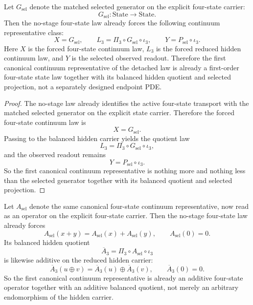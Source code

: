 \begin{theorem}
\label{thm:the-no-stage-four-state-law-already-has-a-canonical-first-order-continuum-representative}
Let \(G_{\mathrm{sel}}\) denote the matched selected generator on the explicit
four-state carrier:
\[
G_{\mathrm{sel}}:\mathrm{State}\to\mathrm{State}.
\]
Then the no-stage four-state law already forces the following continuum
representative class:
\[
X = G_{\mathrm{sel}},\qquad
L_3 = \Pi_3 \circ G_{\mathrm{sel}} \circ \iota_3,\qquad
Y = P_{\mathrm{sel}} \circ \iota_3.
\]
Here \(X\) is the forced four-state continuum law, \(L_3\) is the forced
reduced hidden continuum law, and \(Y\) is the selected observed readout.
Therefore the first canonical continuum representative of the detached law is
already a first-order four-state state law together with its balanced hidden
quotient and selected projection, not a separately designed endpoint PDE.
\end{theorem}

\begin{proof}
The no-stage law already identifies the active four-state transport with the
matched selected generator on the explicit state carrier. Therefore the forced
four-state continuum law is
\[
X=G_{\mathrm{sel}}.
\]
Passing to the balanced hidden carrier yields the quotient law
\[
L_3=\Pi_3\circ G_{\mathrm{sel}}\circ \iota_3,
\]
and the observed readout remains
\[
Y=P_{\mathrm{sel}}\circ \iota_3.
\]
So the first canonical continuum representative is nothing more and nothing
less than the selected generator together with its balanced quotient and
selected projection.
\end{proof}

\begin{theorem}
\label{thm:the-canonical-continuum-representative-is-already-additive}
Let \(A_{\mathrm{sel}}\) denote the same canonical four-state continuum
representative, now read as an operator on the explicit four-state carrier.
Then the no-stage four-state law already forces
\[
A_{\mathrm{sel}}(x+y)=A_{\mathrm{sel}}(x)+A_{\mathrm{sel}}(y),\qquad
A_{\mathrm{sel}}(0)=0.
\]
Its balanced hidden quotient
\[
\overline A_3 = \Pi_3 \circ A_{\mathrm{sel}} \circ \iota_3
\]
is likewise additive on the reduced hidden carrier:
\[
\overline A_3(u\oplus v)=\overline A_3(u)\oplus \overline A_3(v),\qquad
\overline A_3(0)=0.
\]
So the first canonical continuum representative is already an additive
four-state operator together with an additive balanced quotient, not merely an
arbitrary endomorphism of the hidden carrier.
\end{theorem}

